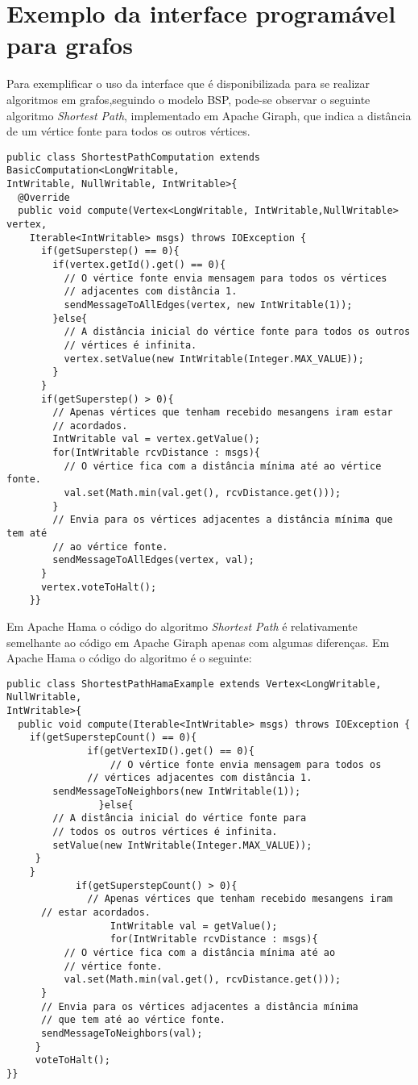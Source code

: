 \section{Exemplo da interface programável para grafos}

Para exemplificar o uso da interface que é disponibilizada para se 
realizar algoritmos em grafos,seguindo o modelo BSP, pode-se observar o 
seguinte algoritmo \textit{Shortest Path}, implementado em Apache Giraph, que 
indica a distância de um vértice fonte para todos os outros vértices.
\begin{verbatim}
public class ShortestPathComputation extends BasicComputation<LongWritable, 
IntWritable, NullWritable, IntWritable>{
  @Override
  public void compute(Vertex<LongWritable, IntWritable,NullWritable> vertex, 
	Iterable<IntWritable> msgs) throws IOException {
	  if(getSuperstep() == 0){
	    if(vertex.getId().get() == 0){
	      // O vértice fonte envia mensagem para todos os vértices 
	      // adjacentes com distância 1.
	      sendMessageToAllEdges(vertex, new IntWritable(1));
	    }else{
	      // A distância inicial do vértice fonte para todos os outros 
	      // vértices é infinita.
	      vertex.setValue(new IntWritable(Integer.MAX_VALUE));			
	    }
	  }
	  if(getSuperstep() > 0){
	    // Apenas vértices que tenham recebido mesangens iram estar 
	    // acordados.
	    IntWritable val = vertex.getValue();		
	    for(IntWritable rcvDistance : msgs){
	      // O vértice fica com a distância mínima até ao vértice fonte.
	      val.set(Math.min(val.get(), rcvDistance.get()));
	    }
	    // Envia para os vértices adjacentes a distância mínima que tem até 
	    // ao vértice fonte.
	    sendMessageToAllEdges(vertex, val);		
	  } 
	  vertex.voteToHalt();
	}}
\end{verbatim}

Em Apache Hama o código do algoritmo \textit{Shortest Path} é relativamente 
semelhante ao código em Apache Giraph apenas com algumas diferenças. Em Apache 
Hama o código do algoritmo é o seguinte:

\begin{verbatim}
public class ShortestPathHamaExample extends Vertex<LongWritable, NullWritable, 
IntWritable>{
  public void compute(Iterable<IntWritable> msgs) throws IOException {
    if(getSuperstepCount() == 0){
		      if(getVertexID().get() == 0){
			      // O vértice fonte envia mensagem para todos os 
		      // vértices adjacentes com distância 1.
        sendMessageToNeighbors(new IntWritable(1));
			    }else{
        // A distância inicial do vértice fonte para 
        // todos os outros vértices é infinita.
        setValue(new IntWritable(Integer.MAX_VALUE));
     }
    }
		    if(getSuperstepCount() > 0){
		      // Apenas vértices que tenham recebido mesangens iram 
      // estar acordados.
			      IntWritable val = getValue();
			      for(IntWritable rcvDistance : msgs){
          // O vértice fica com a distância mínima até ao 
          // vértice fonte.
          val.set(Math.min(val.get(), rcvDistance.get()));
      }
      // Envia para os vértices adjacentes a distância mínima 
      // que tem até ao vértice fonte.
      sendMessageToNeighbors(val);
     }
     voteToHalt();	
}}
\end{verbatim}

